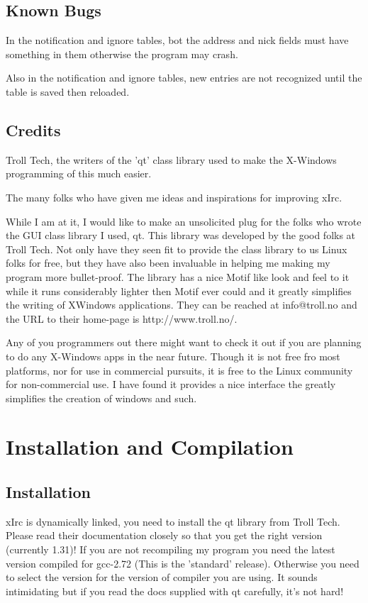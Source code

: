 \documentclass[titlepage]{article}
\begin{document}
\subsection{Known Bugs}
In the notification and ignore tables, bot the address and nick fields 
must have something in them otherwise the program may crash.

Also in the notification and ignore tables, new entries are not recognized 
until the table is saved then reloaded.

\subsection{Credits}
Troll Tech, the writers of the 'qt' class library used to make the
X-Windows programming of this much easier.

The many folks who have given me ideas and inspirations for improving
xIrc.

While I am at it, I would like to  make  an  unsolicited  plug  for
the folks who wrote the GUI class library I used, qt. This library was
developed by the good folks at Troll Tech. Not only have they seen fit
to provide the class library to us Linux folks for free, but they have
also been invaluable in helping me making my program more
bullet-proof. The library has a nice Motif like look and feel to it
while it runs considerably lighter then Motif ever could and it
greatly simplifies the writing of XWindows applications. They can be
reached at info@troll.no and the URL to their home-page is
http://www.troll.no/.

Any of you programmers out there might want to check it out if you are
planning to do any X-Windows apps in the near future. Though it is not
free fro most platforms, nor for use in commercial pursuits, it is free
to the Linux community for non-commercial use. I have found it provides
a nice interface the greatly simplifies the creation of windows and
such.

\section{Installation and Compilation} \subsection{Installation}
 
xIrc is dynamically linked, you need to install the qt library from Troll 
Tech.  Please read their documentation closely so that you get the right 
version (currently 1.31)!  If you are not recompiling my program you need 
the latest version compiled for gcc-2.72 (This is the 'standard' release).  
Otherwise you need to select the version for the version of compiler you 
are using.  It sounds intimidating but if you read the docs supplied with 
qt carefully, it's not hard!  
\end{document}
